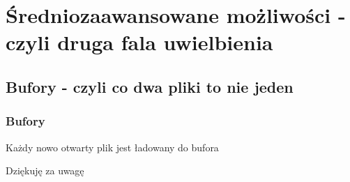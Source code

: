 \documentclass{beamer}
\begin{document}
\section{Średniozaawansowane możliwości - czyli druga fala uwielbienia}
\subsection{Bufory - czyli co dwa pliki to nie jeden}
\begin{frame}
	\frametitle{Bufory}
	{
		Każdy nowo otwarty plik jest ładowany do bufora
	}
\end{frame}
\begin{frame}
	Dziękuję za uwagę
\end{frame}
\end{document}

